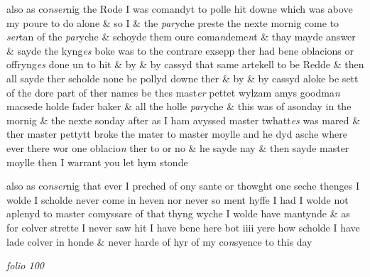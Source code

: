 \documentclass[12pt, a4paper]{book}
\begin{document}
		\ifthenelse{\isodd{\thepage}}
		{\reversemarginpar}
		{\normalmarginpar}
		also as co\textit{nser}nig the Rode I was comandyt to polle hit
 downe which was above my poure to do alone \& so I
 \& the \textit{par}yche preste the nexte mornig come to \textit{ser}tan
 of the \textit{par}yche \& schoyde them oure coma\textit{n}deme\textit{n}t \& thay
 mayde answer \& sayde the kyng\textit{es} boke was to the
 contrare exsepp ther had bene oblacions or offryng\textit{es}
 done un to hit \& by \& by cassyd that same artekell
 to be Redde \& then all sayde ther scholde none be
 pollyd downe ther \& by \& by cassyd aloke be sett
 of the dore part of ther names be thes mast\textit{er}
 pettet wylzam amys goodma\textit{n} macsede holde fader
 baker \& all the holle \textit{par}yche \& this was of asonday
 in the mornig \& the nexte sonday after as I ham
 avyssed master twhatt\textit{es} was mared \& ther  master
			 pettytt
            			broke the mater to master moylle and he dyd
 asche where ever there wor one oblacio\textit{n} ther
            			to or no \& he sayde nay \& then sayde master
 moylle then I warrant you let hym stonde
            		
		\ifthenelse{\isodd{\thepage}}
		{\reversemarginpar}
		{\normalmarginpar}
		also as co\textit{nser}nig that ever I preched of ony sante
 or thowght one seche thenges I wolde I scholde
 never come in heven nor never so ment hyffe I
 had I wolde not aplenyd to master comyssare of
 that thyng wyche I wolde have mantynde \& as
 for colver strette I never saw hit I have bene here
 bot iiii yere how scholde I have lade colver in honde
 \& never harde of hyr of my co\textit{n}syence to this day

\dotfill
					

\textit{folio 100}


         \vspace{4cm}
         
\dotfill
					  \section*{}  \subsection*{}
\end{document}
